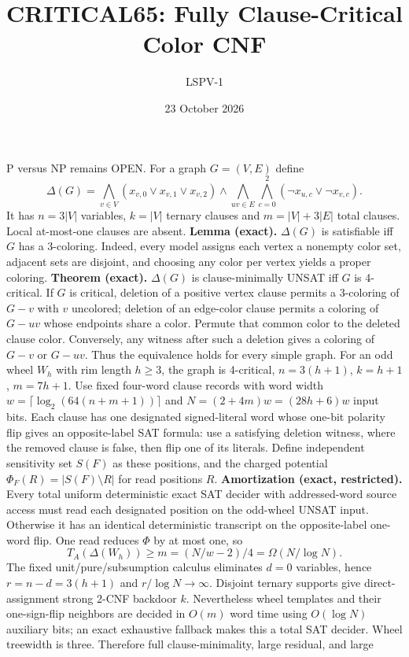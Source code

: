 \documentclass{article}
\title{CRITICAL65: Fully Clause-Critical Color CNF}
\author{LSPV-1}
\date{23 October 2026}
\begin{document}
\maketitle
P versus NP remains OPEN. For a graph $G=(V,E)$ define
\[
\Delta(G)=
\bigwedge_{v\in V}(x_{v,0}\vee x_{v,1}\vee x_{v,2})
\wedge
\bigwedge_{uv\in E}\bigwedge_{c=0}^2
(\neg x_{u,c}\vee\neg x_{v,c}).
\]
It has $n=3|V|$ variables, $k=|V|$ ternary clauses and
$m=|V|+3|E|$ total clauses. Local at-most-one clauses are absent.
\textbf{Lemma (exact).} $\Delta(G)$ is satisfiable iff $G$ has a
3-coloring. Indeed, every model assigns each vertex a nonempty
color set, adjacent sets are disjoint, and choosing any color
per vertex yields a proper coloring.
\textbf{Theorem (exact).} $\Delta(G)$ is clause-minimally UNSAT
iff $G$ is 4-critical. If $G$ is critical, deletion of a
positive vertex clause permits a 3-coloring of $G-v$ with $v$
uncolored; deletion of an edge-color clause permits a coloring
of $G-uv$ whose endpoints share a color. Permute that common
color to the deleted clause color. Conversely, any witness
after such a deletion gives a coloring of $G-v$ or $G-uv$.
Thus the equivalence holds for every simple graph.
For an odd wheel $W_h$ with rim length $h\ge3$, the graph is
4-critical, $n=3(h+1)$, $k=h+1$, $m=7h+1$.
Use fixed four-word clause records with word width
$w=\lceil\log_2(64(n+m+1))\rceil$ and
$N=(2+4m)w=(28h+6)w$ input bits.
Each clause has one designated signed-literal word whose
one-bit polarity flip gives an opposite-label SAT formula:
use a satisfying deletion witness, where the removed clause
is false, then flip one of its literals.
Define independent sensitivity set $S(F)$ as these positions,
and the charged potential $\Phi_F(R)=|S(F)\setminus R|$
for read positions $R$.
\textbf{Amortization (exact, restricted).} Every total uniform
deterministic exact SAT decider with addressed-word source
access must read each designated position on the odd-wheel
UNSAT input. Otherwise it has an identical deterministic
transcript on the opposite-label one-word flip. One read
reduces $\Phi$ by at most one, so
\[
T_A(\Delta(W_h))\ge m=(N/w-2)/4=\Omega(N/\log N).
\]
The fixed unit/pure/subsumption calculus eliminates $d=0$
variables, hence $r=n-d=3(h+1)$ and $r/\log N\to\infty$.
Disjoint ternary supports give direct-assignment strong
2-CNF backdoor $k$. Nevertheless wheel templates and
their one-sign-flip neighbors are decided in $O(m)$ word time
using $O(\log N)$ auxiliary bits; an exact exhaustive fallback
makes this a total SAT decider. Wheel treewidth is three.
Therefore full clause-minimality, large residual, and large
\end{document}
